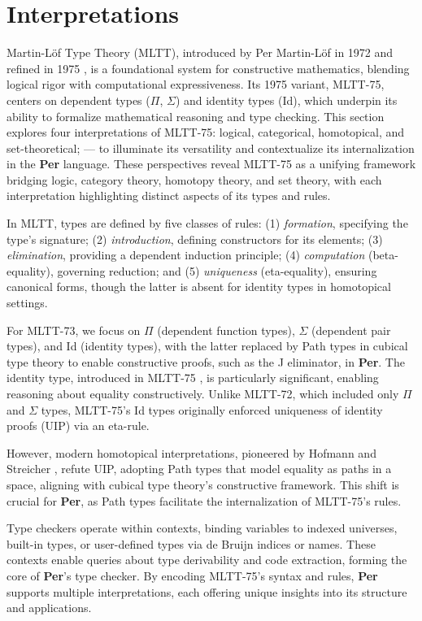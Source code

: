\documentclass{article}
\begin{document}
\section{Interpretations}

Martin-Löf Type Theory (MLTT), introduced by Per Martin-Löf in 1972 \cite{Lof72}
and refined in 1975 \cite{Lof75}, is a foundational system for constructive
mathematics, blending logical rigor with computational expressiveness.
Its 1975 variant, MLTT-75, centers on dependent types ($\Pi$, $\Sigma$)
and identity types (Id), which underpin its ability to formalize mathematical
reasoning and type checking. This section explores four interpretations
of MLTT-75: logical, categorical, homotopical, and set-theoretical; --- to illuminate
its versatility and contextualize its internalization in the \textbf{Per} language.
These perspectives reveal MLTT-75 as a unifying framework bridging logic,
category theory, homotopy theory, and set theory, with each interpretation
highlighting distinct aspects of its types and rules.

In MLTT, types are defined by five classes of rules:
(1) \textit{formation}, specifying the type’s signature;
(2) \textit{introduction}, defining constructors for its elements;
(3) \textit{elimination}, providing a dependent induction principle;
(4) \textit{computation} (beta-equality), governing reduction; and
(5) \textit{uniqueness} (eta-equality), ensuring canonical forms,
though the latter is absent for identity types in homotopical settings.

For MLTT-73, we focus on $\Pi$ (dependent function types), $\Sigma$ (dependent pair types),
and Id (identity types), with the latter replaced by Path types in cubical type theory
to enable constructive proofs, such as the J eliminator, in \textbf{Per}.
The identity type, introduced in MLTT-75 \cite{Lof75}, is particularly significant,
enabling reasoning about equality constructively. Unlike MLTT-72, which included
only $\Pi$ and $\Sigma$ types, MLTT-75’s Id types originally enforced uniqueness
of identity proofs (UIP) via an eta-rule.

However, modern homotopical interpretations, pioneered by Hofmann and
Streicher \cite{Hofmann96}, refute UIP, adopting Path types that model equality
as paths in a space, aligning with cubical type theory’s constructive framework.
This shift is crucial for \textbf{Per}, as Path types facilitate the internalization of MLTT-75’s rules.

Type checkers operate within contexts, binding variables to indexed universes,
built-in types, or user-defined types via de Bruijn indices or names. These
contexts enable queries about type derivability and code extraction, forming
the core of \textbf{Per}’s type checker. By encoding MLTT-75’s syntax and rules,
\textbf{Per} supports multiple interpretations, each offering unique insights
into its structure and applications.
\end{document}
